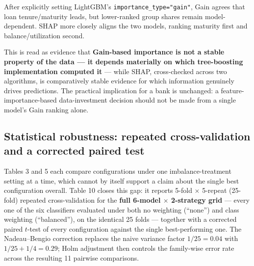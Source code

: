 \documentclass[11pt,a4paper]{article}
\begin{document}
After explicitly setting LightGBM's \texttt{importance\_type="gain"}, Gain agrees that loan tenure/maturity leads, but lower-ranked group shares remain model-dependent. SHAP more closely aligns the two models, ranking maturity first and balance/utilization second.

This is read as evidence that \textbf{Gain-based importance is not a stable property of the data --- it depends materially on which tree-boosting implementation computed it} --- while SHAP, cross-checked across two algorithms, is comparatively stable evidence for which information genuinely drives predictions. The practical implication for a bank is unchanged: a feature-importance-based data-investment decision should not be made from a single model's Gain ranking alone.

\subsection{Statistical robustness: repeated cross-validation and a corrected paired test}
\label{sec:cv}

Tables 3 and 5 each compare configurations under one imbalance-treatment setting at a time, which cannot by itself support a claim about the single best configuration overall. Table 10 closes this gap: it reports 5-fold $\times$ 5-repeat (25-fold) repeated cross-validation for the \textbf{full 6-model $\times$ 2-strategy grid} --- every one of the six classifiers evaluated under both no weighting (``none'') and class weighting (``balanced''), on the identical 25 folds --- together with a corrected paired $t$-test of every configuration against the single best-performing one. The Nadeau--Bengio correction replaces the naive variance factor $1/25=0.04$ with $1/25+1/4=0.29$; Holm adjustment then controls the family-wise error rate across the resulting 11 pairwise comparisons.
\end{document}

